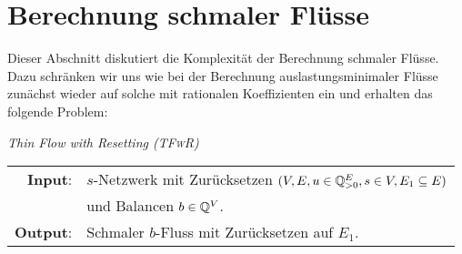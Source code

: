 \section{Berechnung schmaler Flüsse}

Dieser Abschnitt diskutiert die Komplexität der Berechnung schmaler Flüsse.
Dazu schränken wir uns wie bei der Berechnung auslastungsminimaler Flüsse zunächst wieder auf solche mit rationalen Koeffizienten ein und erhalten das folgende Problem:

\newcommand{\probTFwR}{\textit{\textsc{(TFwR)}}}

\newcommand{\probTFwoR}{\textit{\textsc{(TFwoR)}}}

\begin{center}
	\begin{mdframed}
		\centering
		\emph{Thin Flow with Resetting \probTFwR} \\[1em]
		\begin{tabular}{rl}
			{\bfseries Input}: &$s$-Netzwerk mit Zurücksetzen $(V, E, u \in \mathbb{Q}^E_{>0}, s\in V, E_1\subseteq E)$\\
			& und Balancen $b\in \mathbb{Q}^V$.\\
			{\bfseries Output}: &Schmaler $b$-Fluss mit Zurücksetzen auf $E_1$.
		\end{tabular}
	\end{mdframed}
\end{center}

